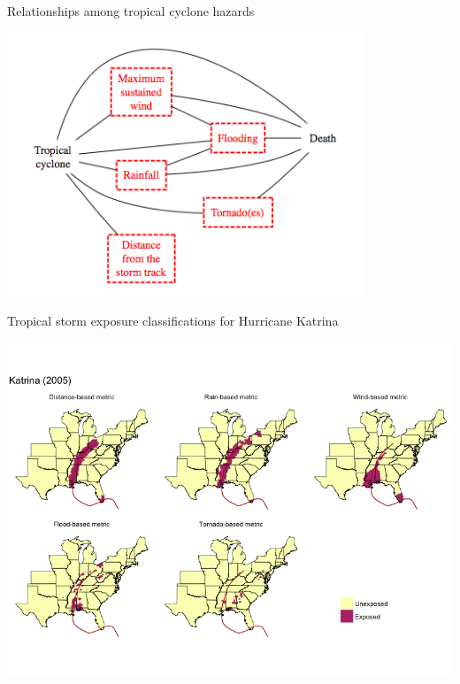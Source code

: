 \documentclass[ignorenonframetext,]{beamer}
\begin{document}
\begin{frame}{Relationships among tropical cyclone hazards}

\begin{center}\includegraphics[width=0.8\textwidth]{figures/metric_relationships} \end{center}

\end{frame}

\begin{frame}{Tropical storm exposure classifications for Hurricane
Katrina}

\begin{center}\includegraphics[width=\textwidth]{figures/katrina_all_exposures} \end{center}

\end{frame}
\end{document}
